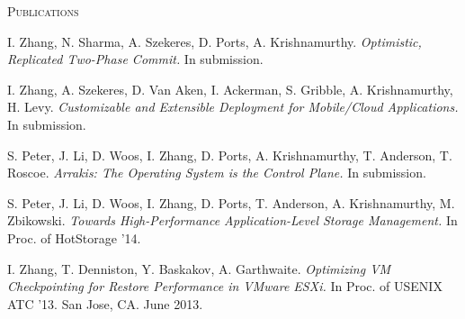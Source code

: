 \documentclass[10pt,times]{report}
\newlength{\sectiongap}
\newlength{\entrygap}
\newlength{\sectioncolwidth}
\newlength{\colgap}
\newlength{\stuffwidth}
\def\ifEqString#1#2{\def\testa{#1}\def\testb{#2}%
  \ifx\testa\testb}
\newenvironment{rtable}{
  \begin{minipage}{\textwidth}
  }{
  \end{minipage}
}
\newenvironment{rentry}[3][xxx]{
  \begin{minipage}[t]{\hsize}
    \textbf{#2}\ifEqString{#1}{xxx}\relax\else, \textit{#1}\fi
    \hspace{\stretch{1}} #3 \\
  }{
    \removelastskip
  \end{minipage}
  \\[\entrygap]  %
}
\newenvironment{rsection}[1]{
  \begin{minipage}[t]{\sectioncolwidth}
    \textsc{#1}
  \end{minipage}
  \hspace{\colgap}
  \begin{minipage}[t]{\stuffwidth}
  }{
    \removelastskip
  \end{minipage}
  \\[\sectiongap]
}
\begin{document}
\begin{rtable}
\vspace{1.0em}
 \begin{rsection}{Publications}
   I. Zhang, N. Sharma, A. Szekeres, D. Ports,
   A. Krishnamurthy. \textit{Optimistic, Replicated Two-Phase Commit.}
   In submission.\\\vspace{-0.5em}

   I. Zhang, A. Szekeres, D. Van Aken, I. Ackerman, S. Gribble,
   A. Krishnamurthy, H. Levy. \textit{Customizable and Extensible
     Deployment for Mobile/Cloud Applications.} In
   submission.\\\vspace{-0.5em}

   S. Peter, J. Li, D. Woos, I. Zhang, D. Ports, A. Krishnamurthy,
   T. Anderson, T. Roscoe. \textit{Arrakis: The Operating System is
     the Control Plane.} In submission.\\\vspace{-0.5em}

   S. Peter, J. Li, D. Woos, I. Zhang, D. Ports, T. Anderson,
   A. Krishnamurthy, M. Zbikowski. \textit{Towards High-Performance
     Application-Level Storage Management.} In Proc. of HotStorage
   '14. \\\vspace{-0.5em}

    I. Zhang, T. Denniston, Y. Baskakov, A. Garthwaite. \textit{Optimizing
      VM Checkpointing for Restore Performance in VMware ESXi.} In
    Proc. of USENIX ATC '13. San Jose, CA. June 2013.\\\vspace{-0.5em}


\end{rsection}
\end{rtable}
\end{document}
